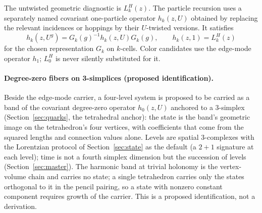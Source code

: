 \documentclass[11pt,letterpaper]{article}
\begin{document}
The untwisted geometric diagnostic is $L_k^H(z)$. The particle recursion uses
a separately named covariant one-particle operator $h_k(z,U)$ obtained by
replacing the relevant incidences or hoppings by their $U$-twisted versions.
It satisfies
\begin{equation*}
  h_k(z,U^g)=G_k(g)^{-1}h_k(z,U)G_k(g),
  \qquad h_k(z,1)=L_k^H(z)
\end{equation*}
for the chosen representation $G_k$ on $k$-cells. Color candidates use the
edge-mode operator $h_1$; $L_0^H$ is never silently substituted for it.

\paragraph{Degree-zero fibers on 3-simplices (proposed identification).}
Beside the edge-mode carrier, a four-level system is proposed to be carried
as a band of the covariant degree-zero operator $h_0(z,U)$ anchored to a
3-simplex (Section~\ref{sec:quarks}, the tetrahedral anchor): the state is
the band's geometric image on the tetrahedron's four vertices, with
coefficients that come from the squared lengths and connection values alone.
Levels are spatial 3-complexes with the Lorentzian protocol of
Section~\ref{sec:state} as the default (a $2+1$ signature at each level);
time is not a fourth simplex dimension but the succession of levels
(Section~\ref{sec:master}). The harmonic band at trivial holonomy is the
vertex-volume chain and carries no state; a single tetrahedron carries only
the states orthogonal to it in the pencil pairing, so a state with nonzero
constant component requires growth of the carrier. This is a proposed
identification, not a derivation.
\end{document}
